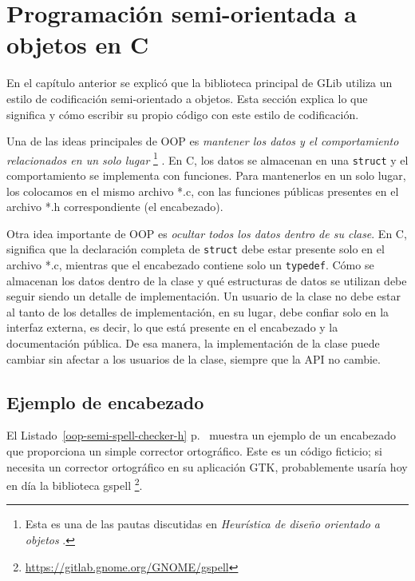 \chapter{Programación semi-orientada a objetos en C}
\label{oop-semi}

En el capítulo anterior se explicó que la biblioteca principal de GLib utiliza un estilo de codificación semi-orientado a objetos. Esta sección explica lo que significa y cómo escribir su propio código con este estilo de codificación.

Una de las ideas principales de OOP es \emph{mantener los datos y el comportamiento relacionados en un solo lugar} \footnote{Esta es una de las pautas discutidas en \emph{Heurística de diseño orientado a objetos} \cite{oop-book}.} . En C, los datos se almacenan en una \lstinline{struct} y el comportamiento se implementa con funciones. Para mantenerlos en un solo lugar, los colocamos en el mismo archivo *.c, con las funciones públicas presentes en el archivo *.h correspondiente (el encabezado).

Otra idea importante de OOP es \emph{ocultar todos los datos dentro de su clase}. En C, significa que la declaración completa de \lstinline{struct} debe estar presente solo en el archivo *.c, mientras que el encabezado contiene solo un \lstinline{typedef}. Cómo se almacenan los datos dentro de la clase y qué estructuras de datos se utilizan debe seguir siendo un detalle de implementación. Un usuario de la clase no debe estar al tanto de los detalles de implementación, en su lugar, debe confiar solo en la interfaz externa, es decir, lo que está presente en el encabezado y la documentación pública. De esa manera, la implementación de la clase puede cambiar sin afectar a los usuarios de la clase, siempre que la API no cambie.

\section{Ejemplo de encabezado}

El Listado~\ref{oop-semi-spell-checker-h} p.~\pageref{oop-semi-spell-checker-h} muestra un ejemplo de un encabezado que proporciona un simple corrector ortográfico. Este es un código ficticio; si necesita un corrector ortográfico en su aplicación GTK, probablemente usaría hoy en día la biblioteca gspell \footnote{\url{https://gitlab.gnome.org/GNOME/gspell}}.



